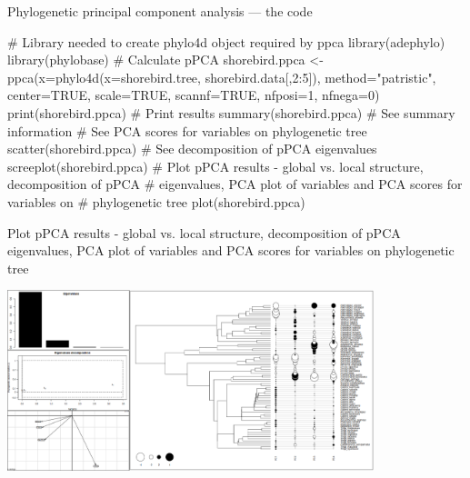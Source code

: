 \documentclass[compress, xelatex, 11pt, xcolor=svgnames, aspectratio=169,
	hyperref={
		bookmarks=true,
		unicode=true,
		colorlinks=true,
		pdftitle={Molecular data in R},
		plainpages=false,
		pdfauthor={Vojtech Zeisek},
		pdfsubject={Course about phylogeny and evolution in R},
		pdfcreator={XeLaTeX},
		pdfkeywords={R, evolution, phylogeny, molecular data},
		linkcolor=Crimson, %
		anchorcolor=Magenta, %
		citecolor=Magenta, %
		filecolor=Magenta, %
		menucolor=Magenta, %
		urlcolor=DodgerBlue, %
		},
	url={hyphens, lowtilde} %
	]{beamer}
\begin{document}
\begin{frame}[fragile]{Phylogenetic principal component analysis --- the code}
	\begin{spluscode}
    # Library needed to create phylo4d object required by ppca
    library(adephylo)
    library(phylobase)
    # Calculate pPCA
    shorebird.ppca <- ppca(x=phylo4d(x=shorebird.tree, shorebird.data[,2:5]),
      method="patristic", center=TRUE, scale=TRUE, scannf=TRUE, nfposi=1,
      nfnega=0)
    print(shorebird.ppca) # Print results
    summary(shorebird.ppca) # See summary information
    # See PCA scores for variables on phylogenetic tree
    scatter(shorebird.ppca)
    # See decomposition of pPCA eigenvalues
    screeplot(shorebird.ppca)
    # Plot pPCA results - global vs. local structure, decomposition of pPCA
    # eigenvalues, PCA plot of variables and PCA scores for variables on
    # phylogenetic tree
    plot(shorebird.ppca)
	\end{spluscode}
\end{frame}

\begin{frame}{Plot pPCA results - global vs. local structure, decomposition of pPCA eigenvalues, PCA plot of variables and PCA scores for variables on phylogenetic tree}
	\begin{center}
		\includegraphics[height=5.25cm]{ppca.png}
	\end{center}
\end{frame}
\end{document}
